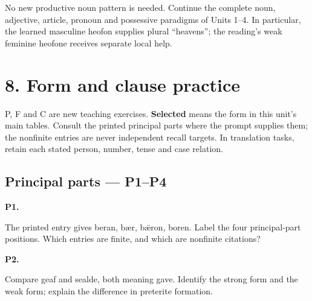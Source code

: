 No new productive noun pattern is needed. Continue the complete noun, adjective, article, pronoun and possessive paradigms of Units 1–4. In particular, the learned masculine heofon supplies plural “heavens”; the reading’s weak feminine heofone receives separate local help.

\section*{8. Form and clause practice}

P, F and C are new teaching exercises. \textbf{Selected} means the form in this unit’s main tables. Consult the printed principal parts where the prompt supplies them; the nonfinite entries are never independent recall targets. In translation tasks, retain each stated person, number, tense and case relation.

\subsection*{Principal parts — P1–P4}

\par\begin{minipage}{\linewidth}\raggedright
\textbf{P1.}

The printed entry gives beran, bær, bǣron, boren. Label the four principal-part positions. Which entries are finite, and which are nonfinite citations?

\end{minipage}\par\addvspace{4pt}

\par\begin{minipage}{\linewidth}\raggedright
\textbf{P2.}

Compare geaf and sealde, both meaning gave. Identify the strong form and the weak form; explain the difference in preterite formation.

\end{minipage}\par\addvspace{4pt}

